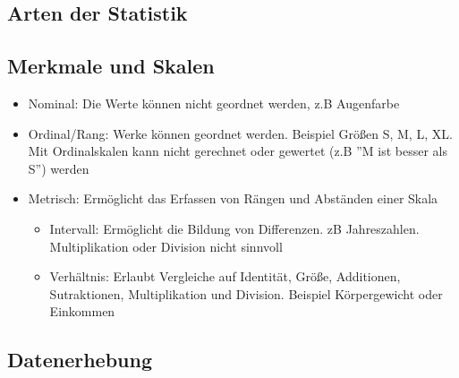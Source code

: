 \subsection{Arten der Statistik}
\subsection{Merkmale und Skalen}

\begin{itemize}

  \item Nominal: Die Werte können nicht geordnet werden, z.B Augenfarbe
  \item Ordinal/Rang: Werke können geordnet werden. Beispiel Größen S, M, L, XL. Mit Ordinalskalen kann nicht gerechnet oder gewertet (z.B ''M ist besser als S'') werden
  \item Metrisch: Ermöglicht das Erfassen von Rängen und Abständen einer Skala
  \begin{itemize}
    \item Intervall: Ermöglicht die Bildung von Differenzen. zB Jahreszahlen. Multiplikation oder Division nicht sinnvoll
    \item Verhältnis: Erlaubt Vergleiche auf Identität, Größe, Additionen, Sutraktionen, Multiplikation und Division. Beispiel Körpergewicht oder Einkommen
  \end{itemize}
\end{itemize}




\subsection{Datenerhebung}
